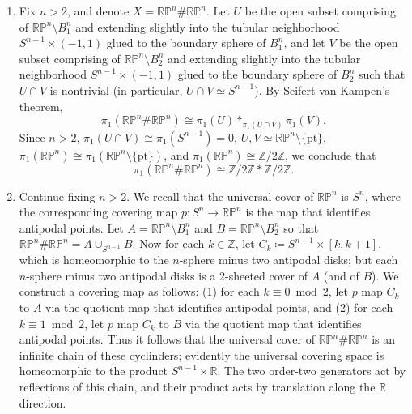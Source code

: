 \documentclass{article}
\begin{document}
	\begin{enumerate}[itemsep =-2pt,label = (\alph{*})]
		\item Fix $n > 2$, and denote $X = \mathbb{RP}^{n} \# \mathbb{RP}^{n}$. Let $U$ be the open subset comprising of $\mathbb{RP}^{n}\setminus B_{1}^{n}$ and extending slightly into the tubular neighborhood $S^{n -1} \times (-1,1)$ glued to the boundary sphere of $B_{1}^{n}$, and let $V$ be the open subset comprising of $\mathbb{RP}^{n} \setminus B_{2}^{n}$ and extending slightly into the tubular neighborhood $S^{n -1} \times (-1,1)$ glued to the boundary sphere of $B_{2}^{n}$ such that $U \cap V$ is nontrivial (in particular, $U \cap V \simeq S^{n-1}$). By Seifert-van Kampen's theorem, 
		\begin{equation*}
			\pi_{1}(\mathbb{RP}^{n} \# \mathbb{RP}^{n}) \cong \pi_{1}(U) \ast_{\pi_{1}(U \cap V)} \pi_{1}(V). 
		\end{equation*}
		Since $n > 2$, $\pi_{1}(U \cap V) \cong \pi_{1}(S^{n-1}) = 0$, $U, V \simeq \mathbb{RP}^{n} \setminus \{\text{pt}\}$, $\pi_{1}(\mathbb{RP}^{n}) \cong \pi_{1}(\mathbb{RP}^{n}\setminus \{\text{pt}\})$, and $\pi_{1}(\mathbb{RP}^{n}) \cong \mathbb{Z}/2\mathbb{Z}$, we conclude that 
		\begin{equation*}
			\pi_{1}(\mathbb{RP}^{n} \# \mathbb{RP}^{n}) \cong \mathbb{Z}/2\mathbb{Z} \ast \mathbb{Z}/2\mathbb{Z}. 
		\end{equation*}
		\item Continue fixing $n > 2$. We recall that the universal cover of $\mathbb{RP}^{n}$ is $S^{n}$, where the corresponding covering map $p: S^{n} \to \mathbb{RP}^{n}$ is the map that identifies antipodal points. Let $A = \mathbb{RP}^{n} \setminus B_{1}^{n}$ and $B  = \mathbb{RP}^{n} \setminus B_{2}^{n}$ so that $\mathbb{RP}^{n} \# \mathbb{RP}^{n} = A \cup_{S^{n-1}} B$. Now for each $k \in \mathbb{Z}$, let $C_{k} \coloneqq S^{n - 1} \times [k, k + 1]$, which is homeomorphic to the $n$-sphere minus two antipodal disks; but each $n$-sphere minus two antipodal disks is a 2-sheeted cover of $A$ (and of $B$). We construct a covering map as follows: (1) for each $k \equiv 0 \bmod{2}$, let $p$ map $C_{k}$ to $A$ via the quotient map that identifies antipodal points, and (2) for each $k \equiv 1 \bmod{2}$, let $p$ map $C_{k}$ to $B$ via the quotient map that identifies antipodal points. Thus it follows that the universal cover of $\mathbb{RP}^{n} \# \mathbb{RP}^{n}$ is an infinite chain of these cyclinders; evidently the universal covering space is homeomorphic to the product $S^{n-1} \times \mathbb{R}$. The two order-two generators act by reflections of this chain, and their product acts by translation along the $\mathbb{R}$ direction.
	\end{enumerate}
	
\end{document}
